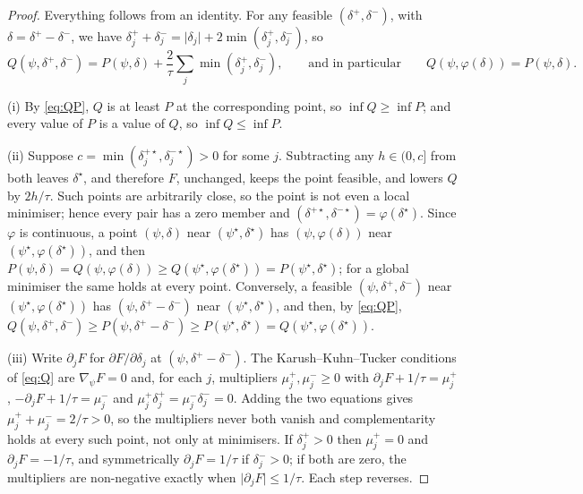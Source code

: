 \begin{proof}
Everything follows from an identity. For any feasible $(\delta^+, \delta^-)$, with
$\delta = \delta^+ - \delta^-$, we have $\delta^+_j + \delta^-_j = \lvert\delta_j\rvert
+ 2\min(\delta^+_j, \delta^-_j)$, so
\begin{equation}
  Q(\psi, \delta^+, \delta^-) = P(\psi, \delta)
    + \frac{2}{\tau}\sum_j \min(\delta^+_j, \delta^-_j),
  \qquad\text{and in particular}\qquad
  Q(\psi, \varphi(\delta)) = P(\psi, \delta).
  \label{eq:QP}
\end{equation}

(i) By \eqref{eq:QP}, $Q$ is at least $P$ at the corresponding point, so
$\inf Q \ge \inf P$; and every value of $P$ is a value of $Q$, so
$\inf Q \le \inf P$.

(ii) Suppose $c = \min(\delta^{+\star}_j, \delta^{-\star}_j) > 0$ for some $j$.
Subtracting any $h \in (0, c]$ from both leaves $\delta^\star$, and
therefore $F$, unchanged, keeps the point feasible, and lowers $Q$ by
$2h/\tau$. Such points are arbitrarily close, so the point is not even a
local minimiser; hence every pair has a zero member and
$(\delta^{+\star}, \delta^{-\star}) = \varphi(\delta^\star)$. Since $\varphi$ is continuous, a
point $(\psi, \delta)$ near $(\psi^\star, \delta^\star)$ has
$(\psi, \varphi(\delta))$ near $(\psi^\star, \varphi(\delta^\star))$, and then
$P(\psi, \delta) = Q(\psi, \varphi(\delta)) \ge Q(\psi^\star, \varphi(\delta^\star)) =
P(\psi^\star, \delta^\star)$; for a global minimiser the same holds at every
point. Conversely, a feasible $(\psi, \delta^+, \delta^-)$ near
$(\psi^\star, \varphi(\delta^\star))$ has $(\psi, \delta^+ - \delta^-)$ near
$(\psi^\star, \delta^\star)$, and then, by \eqref{eq:QP},
$Q(\psi, \delta^+, \delta^-) \ge P(\psi, \delta^+ - \delta^-) \ge
P(\psi^\star, \delta^\star) = Q(\psi^\star, \varphi(\delta^\star))$.

(iii) Write $\partial_j F$ for $\partial F/\partial\delta_j$ at
$(\psi, \delta^+ - \delta^-)$. The Karush--Kuhn--Tucker conditions of \eqref{eq:Q}
are $\nabla_\psi F = 0$ and, for each $j$, multipliers $\mu^+_j, \mu^-_j \ge 0$ with
$\partial_j F + 1/\tau = \mu^+_j$, $-\partial_j F + 1/\tau = \mu^-_j$ and
$\mu^+_j\delta^+_j = \mu^-_j\delta^-_j = 0$. Adding the two equations gives
$\mu^+_j + \mu^-_j = 2/\tau > 0$, so the multipliers never both vanish and
complementarity holds at every such point, not only at minimisers. If
$\delta^+_j > 0$ then $\mu^+_j = 0$ and $\partial_j F = -1/\tau$, and symmetrically
$\partial_j F = 1/\tau$ if $\delta^-_j > 0$; if both are zero, the multipliers are
non-negative exactly when $\lvert \partial_j F\rvert \le 1/\tau$. Each step reverses.
\end{proof}

